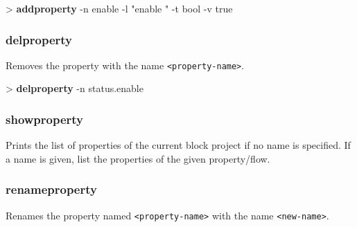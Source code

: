 \documentclass[10pt,a4paper]{article}
\begin{document}
\begin{sampletitle}
> \textbf{\tool{} addproperty} -n enable -l "enable \kind{}" -t bool -v true
\end{sampletitle}


\subsubsection{delproperty}
\label{subsec:delproperty}

Removes the property with the name \texttt{<property-name>}.\\


\begin{sampletitle}
> \textbf{\tool{} delproperty} -n status.enable
\end{sampletitle}


\subsubsection{showproperty}
\label{subsec:showproperty}

Prints the list of properties of the current block project if no name is specified. If a name is given, list the properties of the given property/flow.

\subsubsection{renameproperty}
\label{subsec:renameproperty}

Renames the property named \texttt{<property-name>} with the name \texttt{<new-name>}.\\
\end{document}
